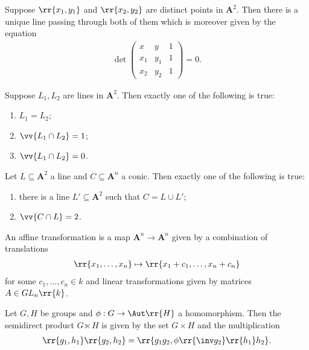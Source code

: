 \documentclass{article}
\begin{document}
\begin{proposition}
  Suppose $\rr{x_1,y_1}$ and $\rr{x_2,y_2}$ are distinct points in $\mathbf A^2$. Then
  there is a unique line passing through both of them which is moreover given by the
  equation
  \begin{align*}
    \det\begin{pmatrix}
      x   & y   & 1 \\
      x_1 & y_1 & 1 \\
      x_2 & y_2 & 1
    \end{pmatrix}
    = 0.
  \end{align*}
\end{proposition}

\begin{proposition}
  Suppose $L_1,L_2$ are lines in $\mathbf A^2$. Then exactly one of the following is true:
  \begin{enumerate}
    \item $L_1=L_2$;
    \item $\vv{L_1\cap L_2}=1$;
    \item $\vv{L_1\cap L_2}=0$.
  \end{enumerate}
\end{proposition}

\begin{proposition}
  Let $L\subseteq\mathbf A^2$ a line and $C\subseteq\mathbf A^n$ a conic. Then
  exactly one of the following is true:
  \begin{enumerate}
    \item there is a line $L'\subseteq\mathbf A^2$ such that $C=L\cup L'$;
    \item $\vv{C\cap L}=2$.
  \end{enumerate}
\end{proposition}

\begin{definition}
  An affine transformation is a map $\mathbf A^n\to\mathbf A^n$ given by a combination of
  translations
  \begin{align*}
    \rr{x_1,\ldots,x_n} \mapsto \rr{x_1 + c_1,\ldots,x_n+c_n}
  \end{align*}
  for some $c_1,\ldots,c_n\in k$ and linear transformations given by matrices $A\in GL_n\rr{k}$.
\end{definition}

\begin{definition}
  Let $G,H$ be groups and $\phi:G\to\Aut\rr{H}$ a homomorphism.
  Then the semidirect product $G\ltimes H$ is given by the set $G\times H$ and
  the multiplication
  \begin{align*}
    \rr{g_1,h_1}\rr{g_2,h_2} = \rr{g_1g_2,\phi\rr{\inv g_2}\rr{h_1}h_2}.
  \end{align*}
\end{definition}
\end{document}
